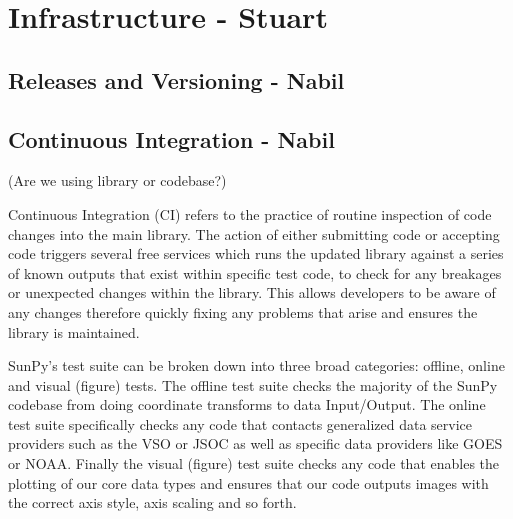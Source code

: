 \section{Infrastructure - Stuart}
\label{sec:infrastructure}

\subsection{Releases and Versioning - Nabil}
\subsection{Continuous Integration - Nabil}

(Are we using library or codebase?)

Continuous Integration (CI) refers to the practice of routine inspection of code changes into the main  library.
The action of either submitting code or accepting code triggers several free services which runs the updated  library against a series of known outputs that exist within specific test code, to check for any breakages or unexpected changes within the  library.
This allows developers to be aware of any changes therefore quickly fixing any problems that arise and ensures the library is maintained.

SunPy's test suite can be broken down into three broad categories: offline, online and visual (figure) tests. 
The offline test suite checks the majority of the SunPy codebase from doing coordinate transforms to data Input/Output.
The online test suite specifically checks any code that contacts generalized data service providers such as the VSO or JSOC as well as specific data providers like GOES or NOAA.
Finally the visual (figure) test suite checks any code that enables the plotting of our core data types and ensures that our code outputs images with the correct axis style, axis scaling and so forth.

